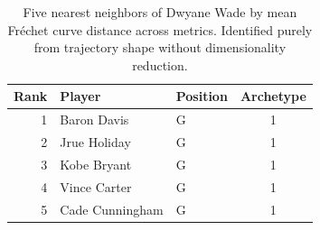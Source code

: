 \begin{table}[htbp]
  \centering\small
  \begin{tabular}{rllc}
    \toprule
    Rank & Player & Position & Archetype \\
    \midrule
    1 & Baron Davis & G & 1 \\
    2 & Jrue Holiday & G & 1 \\
    3 & Kobe Bryant & G & 1 \\
    4 & Vince Carter & G & 1 \\
    5 & Cade Cunningham & G & 1 \\
    \bottomrule
  \end{tabular}
  \caption{Five nearest neighbors of Dwyane Wade by mean Fr\'{e}chet curve distance across metrics. Identified purely from trajectory shape without dimensionality reduction.}
  \label{tab:Dwyane_Wade_frechet_curve_neighbors}
\end{table}

